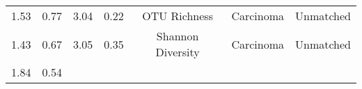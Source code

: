 \documentclass[12pt,]{article}
\begin{document}
\begin{longtable}[]{@{}ccccccc@{}}
\begin{minipage}[t]{0.09\columnwidth}
1.53\strut
\end{minipage} & \begin{minipage}[t]{0.16\columnwidth}\centering\strut
0.77\strut
\end{minipage} & \begin{minipage}[t]{0.16\columnwidth}\centering\strut
3.04\strut
\end{minipage} & \begin{minipage}[t]{0.07\columnwidth}\centering\strut
0.22\strut
\end{minipage} & \begin{minipage}[t]{0.14\columnwidth}\centering\strut
OTU Richness\strut
\end{minipage} & \begin{minipage}[t]{0.09\columnwidth}\centering\strut
Carcinoma\strut
\end{minipage} & \begin{minipage}[t]{0.11\columnwidth}\centering\strut
Unmatched\strut
\end{minipage}\tabularnewline
\begin{minipage}[t]{0.09\columnwidth}\centering\strut
1.43\strut
\end{minipage} & \begin{minipage}[t]{0.16\columnwidth}\centering\strut
0.67\strut
\end{minipage} & \begin{minipage}[t]{0.16\columnwidth}\centering\strut
3.05\strut
\end{minipage} & \begin{minipage}[t]{0.07\columnwidth}\centering\strut
0.35\strut
\end{minipage} & \begin{minipage}[t]{0.14\columnwidth}\centering\strut
Shannon Diversity\strut
\end{minipage} & \begin{minipage}[t]{0.09\columnwidth}\centering\strut
Carcinoma\strut
\end{minipage} & \begin{minipage}[t]{0.11\columnwidth}\centering\strut
Unmatched\strut
\end{minipage}\tabularnewline
\begin{minipage}[t]{0.09\columnwidth}\centering\strut
1.84\strut
\end{minipage} & \begin{minipage}[t]{0.16\columnwidth}\centering\strut
0.54\strut
\end{minipage} & \begin{minipage}[t]{0.16\columnwidth}\centering\strut

\end{minipage}
\end{longtable}
\end{document}
